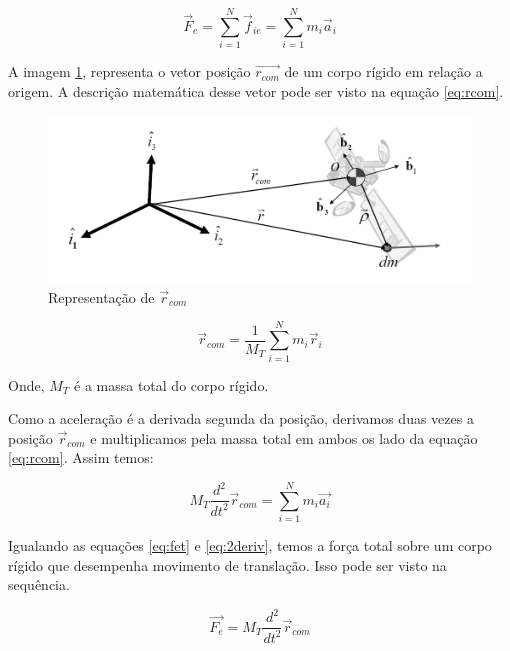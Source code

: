 \begin{equation}\label{eq:fet}
  \vec{F}_{e}=\sum_{i=1}^{N}{\vec{f}_{ie}}=\sum_{i=1}^{N}{m_i\vec{a}_i} 
\end{equation}

A imagem \ref{fig:translacao_referencial_snider_p15}, representa o vetor posição $\vec{r_{com}}$ de um corpo rígido em relação a origem. A descrição matemática desse vetor pode ser visto na equação \ref{eq:rcom}.

\begin{figure}[H]
  \caption{Representação de $\vec{r}_{com}$}
  \begin{center}
      \includegraphics[scale=0.5]{referencial/img/translacao_referencial_snider_p15}
  \end{center}
  \label{fig:translacao_referencial_snider_p15}
\end{figure}

\begin{equation}\label{eq:rcom}
  \vec{r}_{com}=\frac{1}{M_T}\sum_{i=1}^{N}{m_i\vec{r}_i} 
\end{equation}

Onde, $M_T$ é a massa total do corpo rígido.

Como a aceleração é a derivada segunda da posição, derivamos duas vezes a posição $\vec{r}_{com}$ e multiplicamos pela massa total em ambos os lado da equação \ref{eq:rcom}. Assim temos:

\begin{equation}\label{eq:2deriv}
  M_T\frac{{d}^{2}}{{d}t^{2}}\vec{r}_{com}=\sum_{i=1}^{N}{m_i\vec{a_i}}
\end{equation}

Igualando as equações \ref{eq:fet} e \ref{eq:2deriv}, temos a força total sobre um corpo rígido que desempenha movimento de translação. Isso pode ser visto na sequência.

\begin{equation}
\vec{F_e}=M_{T}\frac{{d}^{2}}{{d}t^{2}}\vec{r}_{com}
\end{equation}

